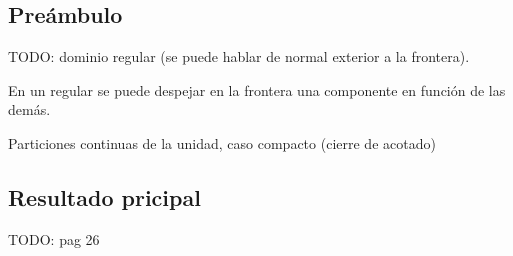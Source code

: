 \documentclass[12pt,spanish]{article}
\theoremstyle{definition}
\theoremstyle{remark}
\begin{document}
\subsection{Preámbulo}

TODO: dominio regular (se puede hablar de normal exterior a la frontera).

En un regular se puede despejar en la frontera una componente en función de las demás.

Particiones continuas de la unidad, caso compacto (cierre de acotado)

\subsection{Resultado pricipal}

TODO: pag 26
\end{document}
